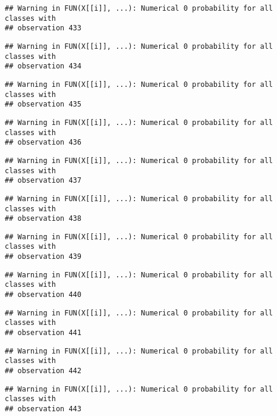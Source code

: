 \documentclass[
]{article}
\begin{document}
\begin{verbatim}
## Warning in FUN(X[[i]], ...): Numerical 0 probability for all classes with
## observation 433
\end{verbatim}

\begin{verbatim}
## Warning in FUN(X[[i]], ...): Numerical 0 probability for all classes with
## observation 434
\end{verbatim}

\begin{verbatim}
## Warning in FUN(X[[i]], ...): Numerical 0 probability for all classes with
## observation 435
\end{verbatim}

\begin{verbatim}
## Warning in FUN(X[[i]], ...): Numerical 0 probability for all classes with
## observation 436
\end{verbatim}

\begin{verbatim}
## Warning in FUN(X[[i]], ...): Numerical 0 probability for all classes with
## observation 437
\end{verbatim}

\begin{verbatim}
## Warning in FUN(X[[i]], ...): Numerical 0 probability for all classes with
## observation 438
\end{verbatim}

\begin{verbatim}
## Warning in FUN(X[[i]], ...): Numerical 0 probability for all classes with
## observation 439
\end{verbatim}

\begin{verbatim}
## Warning in FUN(X[[i]], ...): Numerical 0 probability for all classes with
## observation 440
\end{verbatim}

\begin{verbatim}
## Warning in FUN(X[[i]], ...): Numerical 0 probability for all classes with
## observation 441
\end{verbatim}

\begin{verbatim}
## Warning in FUN(X[[i]], ...): Numerical 0 probability for all classes with
## observation 442
\end{verbatim}

\begin{verbatim}
## Warning in FUN(X[[i]], ...): Numerical 0 probability for all classes with
## observation 443
\end{verbatim}
\end{document}
